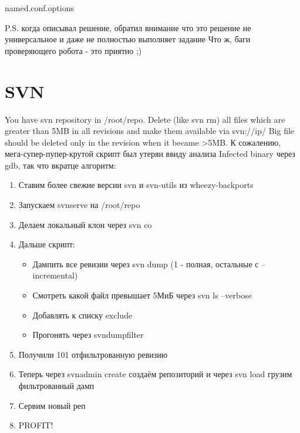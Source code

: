 \documentclass[a4paper,10pt]{report}
\begin{document}
\begin{listing}[H]
  \inputminted[linenos=true, fontsize=\scriptsize, samepage=true]{text}{named.conf.options}
  \caption{named.conf.options}
  \label{lst:named.conf.options}
\end{listing}
P.S. когда описывал решение, обратил внимание что это решение не универсальное и даже не полностью выполняет задание
\newline
Что ж, баги проверяющего робота - это приятно ;)

\chapter{SVN}
You have svn repository in /root/repo. Delete (like svn rm) all files which are greater than 5MB in all revisions and make them available via svn://ip/
\newline
Big file should be deleted only in the revision when it became >5MB.
\newline\newline
К сожалению, мега-супер-пупер-крутой скрипт был утерян ввиду анализа Infected binary через gdb, так что вкратце алгоритм:
\begin{enumerate}
  \item Ставим более свежие версии svn и svn-utils из wheezy-backports
  \item Запускаем svnserve на /root/repo
  \item Делаем локальный клон через svn co
  \item Дальше скрипт:
  \begin{itemize}
    \item Дампить все ревизии через svn dump (1 - полная, остальные с --incremental)
    \item Смотреть какой файл превышает 5МиБ через svn ls --verbose
    \item Добавлять к списку exclude
    \item Прогонять через svndumpfilter
  \end{itemize}
  \item Получили 101 отфильтрованную ревизию
  \item Теперь через svnadmin create создаём репозиторий и через svn load грузим фильтрованный дамп
  \item Сервим новый реп
  \item PROFIT!
\end{enumerate}
\end{document}
